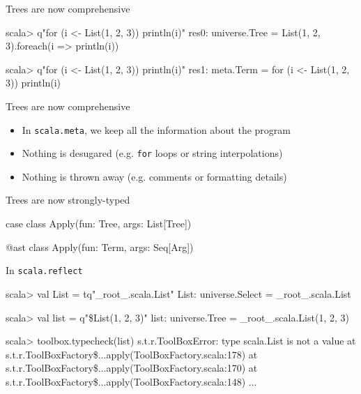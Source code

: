 \documentclass[svgnames,dvipsnames,hyperref={bookmarks=false},usepdftitle=false]{beamer}
\begin{document}

\begin{frame}[fragile]{Trees are now comprehensive}
\begin{beforeblock}
scala> q"for (i <- List(1, 2, 3)) println(i)"
res0: universe.Tree = List(1, 2, 3).foreach(i => println(i))
\end{beforeblock}
\pause
\begin{afterblock}
scala> q"for (i <- List(1, 2, 3)) println(i)"
res1: meta.Term = for (i <- List(1, 2, 3)) println(i)
\end{afterblock}
\end{frame}

\begin{frame}{Trees are now comprehensive}
\begin{itemize}
\item In \texttt{scala.meta}, we keep all the information about the program
\item Nothing is desugared (e.g. \texttt{for} loops or string interpolations)
\item Nothing is thrown away (e.g. comments or formatting details)
\end{itemize}

\end{frame}
\begin{frame}[fragile]{Trees are now strongly-typed}
\begin{beforeblock}
case class Apply(fun: Tree, args: List[Tree])
\end{beforeblock}
\begin{afterblock}
@ast class Apply(fun: Term, args: Seq[Arg])
\end{afterblock}
\end{frame}

\begin{frame}[fragile]{In \texttt{scala.reflect}}
\begin{semiverbatim}
scala> val List = tq"_root_.scala.List"
List: universe.Select = _root_.scala.List

scala> val list = q"\$List(1, 2, 3)"
list: universe.Tree = _root_.scala.List(1, 2, 3)

scala> toolbox.typecheck(list)
s.t.r.ToolBoxError: type scala.List is not a value
  at s.t.r.ToolBoxFactory\$...apply(ToolBoxFactory.scala:178)
  at s.t.r.ToolBoxFactory\$...apply(ToolBoxFactory.scala:170)
  at s.t.r.ToolBoxFactory\$...apply(ToolBoxFactory.scala:148)
  ...
\end{semiverbatim}
\end{frame}
\end{document}
